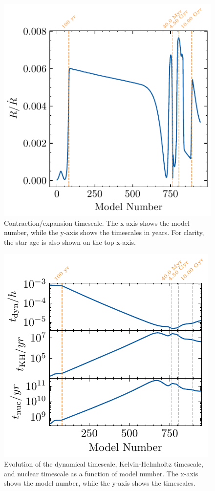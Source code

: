 \documentclass[twocolumn,fontsize=11pt]{scrartcl}
\begin{document}
\begin{figure}[htbp]
    \centering
    \includegraphics{R_dot_vs_model_number.pdf}
    \caption{Contraction/expansion timescale. The x-axis shows the model number, while the y-axis shows the timescales in years. For clarity, the star age is also shown on the top x-axis.}
    \label{fig:q14_timescales}
\end{figure}
\begin{figure}[htbp]
    \centering
    \includegraphics{timescales_vs_model_number.pdf}
    \caption{Evolution of the dynamical timescale, Kelvin-Helmholtz timescale, and nuclear timescale as a function of model number. The x-axis shows the model number, while the y-axis shows the timescales. }
    \label{fig:q15_timescales}
\end{figure}
\clearpage
\end{document}
